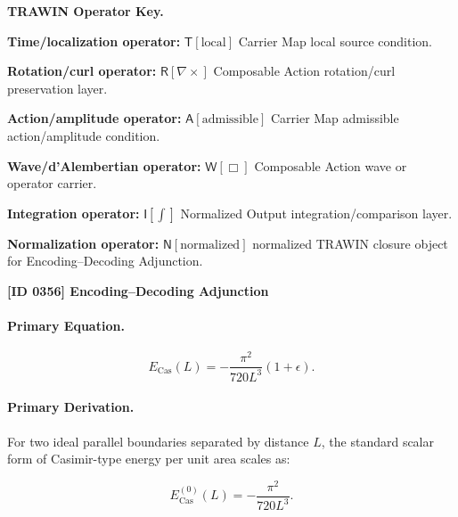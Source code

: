 \par\vspace{0.45\baselineskip}
\noindent\begin{minipage}[t]{\linewidth}
\begingroup
\small
\raggedright
\textbf{TRAWIN Operator Key.}\par
\noindent\textbf{Time/localization operator:} $\mathsf{T}\!\left[\mathrm{local}\right]$ Carrier Map local source condition.\par
\noindent\textbf{Rotation/curl operator:} $\mathsf{R}\!\left[\nabla\times\right]$ Composable Action rotation/curl preservation layer.\par
\noindent\textbf{Action/amplitude operator:} $\mathsf{A}\!\left[\mathrm{admissible}\right]$ Carrier Map admissible action/amplitude condition.\par
\noindent\textbf{Wave/d'Alembertian operator:} $\mathsf{W}\!\left[\Box\right]$ Composable Action wave or operator carrier.\par
\noindent\textbf{Integration operator:} $\mathsf{I}\!\left[\int\right]$ Normalized Output integration/comparison layer.\par
\noindent\textbf{Normalization operator:} $\mathsf{N}\!\left[\mathrm{normalized}\right]$ normalized TRAWIN closure object for Encoding--Decoding Adjunction.\par
\endgroup
\end{minipage}

\clearpage
\noindent\textbf{[ID 0356] Encoding--Decoding Adjunction}\par
\vspace{0.35em}
\paragraph{Primary Equation.}
\begin{equation}
E_{\mathrm{Cas}}(L)
=
-\frac{\pi^2}{720L^3}(1+\epsilon).
\end{equation}

\paragraph{Primary Derivation.}
For two ideal parallel boundaries separated by distance $L$, the standard scalar form of Casimir-type energy per unit area scales as:

\begin{equation}
E_{\mathrm{Cas}}^{(0)}(L)
=
-\frac{\pi^2}{720L^3}.
\end{equation}

